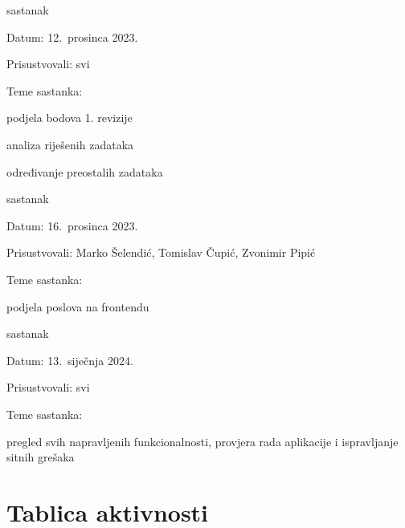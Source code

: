 \begin{packed_enum}
			\item  sastanak
			\item[] \begin{packed_item}
				\item Datum: 12.\ prosinca 2023.
				\item Prisustvovali: svi
				\item Teme sastanka:
				\begin{packed_item}
					\item  podjela bodova 1. revizije
					\item  analiza riješenih zadataka
					\item  određivanje preostalih zadataka 
				\end{packed_item}
			\end{packed_item}

   			\item  sastanak
			\item[] \begin{packed_item}
				\item Datum: 16.\ prosinca 2023.
				\item Prisustvovali: Marko Šelendić, Tomislav Čupić, Zvonimir Pipić
				\item Teme sastanka:
				\begin{packed_item}
					\item  podjela poslova na frontendu
				\end{packed_item}
			\end{packed_item}

			\item  sastanak
			\item[] \begin{packed_item}
				\item Datum: 13.\ siječnja 2024.
				\item Prisustvovali: svi
				\item Teme sastanka:
				\begin{packed_item}
					\item  pregled svih napravljenih funkcionalnosti, provjera rada aplikacije i ispravljanje sitnih grešaka 
				\end{packed_item}
			\end{packed_item}

		\end{packed_enum}
		
		\eject{}
		\section*{Tablica aktivnosti}
		
